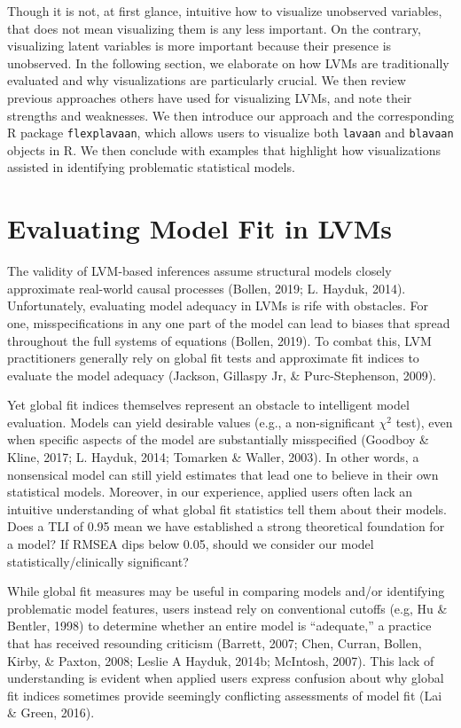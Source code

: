 \documentclass[
  english,
  doc]{apa6}
\begin{document}
Though it is not, at first glance, intuitive how to visualize unobserved variables, that does not mean visualizing them is any less important. On the contrary, visualizing latent variables is more important because their presence is unobserved. In the following section, we elaborate on how LVMs are traditionally evaluated and why visualizations are particularly crucial. We then review previous approaches others have used for visualizing LVMs, and note their strengths and weaknesses. We then introduce our approach and the corresponding R package \texttt{flexplavaan}, which allows users to visualize both \texttt{lavaan} and \texttt{blavaan} objects in R. We then conclude with examples that highlight how visualizations assisted in identifying problematic statistical models.

\hypertarget{evaluating-model-fit-in-lvms}{%
\section{Evaluating Model Fit in LVMs}\label{evaluating-model-fit-in-lvms}}

The validity of LVM-based inferences assume structural models closely approximate real-world causal processes (Bollen, 2019; L. Hayduk, 2014). Unfortunately, evaluating model adequacy in LVMs is rife with obstacles. For one, misspecifications in any one part of the model can lead to biases that spread throughout the full systems of equations (Bollen, 2019). To combat this, LVM practitioners generally rely on global fit tests and approximate fit indices to evaluate the model adequacy (Jackson, Gillaspy Jr, \& Purc-Stephenson, 2009).

Yet global fit indices themselves represent an obstacle to intelligent model evaluation. Models can yield desirable values (e.g., a non-significant \(\chi^2\) test), even when specific aspects of the model are substantially misspecified (Goodboy \& Kline, 2017; L. Hayduk, 2014; Tomarken \& Waller, 2003). In other words, a nonsensical model can still yield estimates that lead one to believe in their own statistical models. Moreover, in our experience, applied users often lack an intuitive understanding of what global fit statistics tell them about their models. Does a TLI of 0.95 mean we have established a strong theoretical foundation for a model? If RMSEA dips below 0.05, should we consider our model statistically/clinically significant?

While global fit measures may be useful in comparing models and/or identifying problematic model features, users instead rely on conventional cutoffs (e.g, Hu \& Bentler, 1998) to determine whether an entire model is ``adequate,'' a practice that has received resounding criticism (Barrett, 2007; Chen, Curran, Bollen, Kirby, \& Paxton, 2008; Leslie A Hayduk, 2014b; McIntosh, 2007). This lack of understanding is evident when applied users express confusion about why global fit indices sometimes provide seemingly conflicting assessments of model fit (Lai \& Green, 2016).
\end{document}
